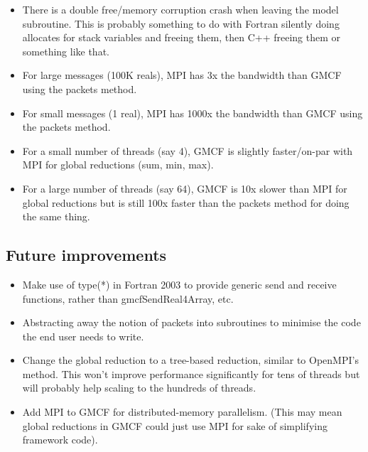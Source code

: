 \documentclass{article}
\begin{document}
\begin{itemize}

    \item There is a double free/memory corruption crash when leaving the model
    subroutine. This is probably something to do with Fortran silently doing
    allocates for stack variables and freeing them, then C++ freeing them or
    something like that.

    \item For large messages (100K reals), MPI has 3x the bandwidth than GMCF
    using the packets method.

    \item For small messages (1 real), MPI has 1000x the bandwidth than GMCF
    using the packets method.

    \item For a small number of threads (say 4), GMCF is slightly faster/on-par
    with MPI for global reductions (sum, min, max).

    \item For a large number of threads (say 64), GMCF is 10x slower than MPI
    for global reductions but is still 100x faster than the packets method for
    doing the same thing.

\end{itemize}

\subsection{Future improvements}

\begin{itemize}

    \item Make use of type(*) in Fortran 2003 to provide generic send and
    receive functions, rather than gmcfSendReal4Array, etc.

    \item Abstracting away the notion of packets into subroutines to minimise
    the code the end user needs to write.

    \item Change the global reduction to a tree-based reduction, similar to
    OpenMPI's method. This won't improve performance significantly for tens of
    threads but will probably help scaling to the hundreds of threads.

    \item Add MPI to GMCF for distributed-memory parallelism. (This may mean
    global reductions in GMCF could just use MPI for sake of simplifying
    framework code).

\end{itemize}
\end{document}
